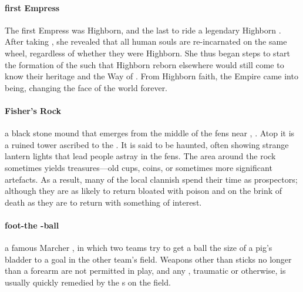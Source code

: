 \paragraph{first Empress} The first Empress was Highborn, and the last to ride a legendary Highborn . After taking , she revealed that all human souls are re-incarnated on the same wheel, regardless of whether they were Highborn. She thus began steps to start the formation of the  such that Highborn reborn elsewhere would still come to know their heritage and the Way of . From Highborn faith, the Empire came into being, changing the face of the world forever.
\paragraph{Fisher’s Rock} a black stone mound that emerges from the middle of the fens near , . Atop it is a ruined tower ascribed to the . It is said to be haunted, often showing strange lantern lights that lead people astray in the fens. The area around the rock sometimes yields treasures—old cups, coins, or sometimes more significant artefacts. As a result, many of the local clannish  spend their time as prospectors; although they are as likely to return bloated with poison and on the brink of death as they are to return with something of interest. 
\paragraph{foot-the -ball} a famous Marcher , in which two teams try to get a ball the size of a pig's bladder to a goal in the other team's field. Weapons other than sticks no longer than a forearm are not permitted in play, and any , traumatic or otherwise, is usually quickly remedied by the s on the field.
